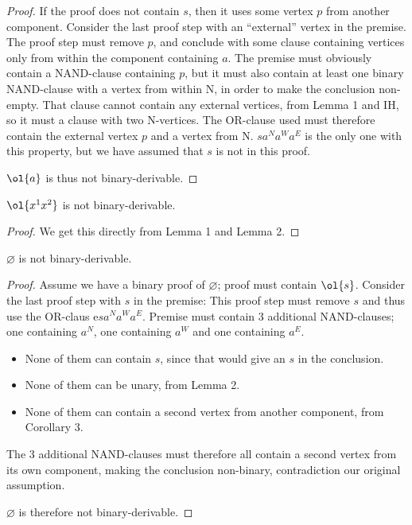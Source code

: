 \begin{proof}
  If the proof does not contain $s$, then it uses some vertex $p$ from another component.
  Consider the last proof step with an ``external'' vertex in the premise.
  The proof step must remove $p$, and conclude with some clause containing vertices only from within the component containing $a$.
  The premise must obviously contain a NAND-clause containing $p$, but it must also contain at least one binary NAND-clause with a vertex from within N, in order to make the conclusion non-empty.
  That clause cannot contain any external vertices, from Lemma 1 and IH, so it must a clause with two N-vertices.
  The OR-clause used must therefore contain the external vertex $p$ and a vertex from N.
  $sa^Na^Wa^E$ is the only one with this property, but we have assumed that $s$ is not in this proof.

  $\ol{a}$ is thus not binary-derivable.
\end{proof}
\begin{corollary}
  $\ol{x^1x^2}$ is not binary-derivable.
  \label{thm:non_binary_derivable_uv}
\end{corollary}
\begin{proof}
  We get this directly from Lemma 1 and Lemma 2.
\end{proof}

\begin{theorem}
  $\varnothing$ is not binary-derivable.
  \label{thm:non_binary_derivable_paradox}
\end{theorem}
\begin{proof}
  Assume we have a binary proof of $\varnothing$;
  proof must contain $\ol{s}$.
  Consider the last proof step with $s$ in the premise:
  This proof step must remove $s$ and thus use the OR-claus e$sa^Na^Wa^E$.
  Premise must contain 3 additional NAND-clauses;
  one containing $a^N$, one containing $a^W$ and one containing $a^E$.
  \begin{itemize}
    \item None of them can contain $s$, since that would give an $s$ in the conclusion.
    \item None of them can be unary, from Lemma 2.
    \item None of them can contain a second vertex from another component, from Corollary 3.
  \end{itemize}
  The 3 additional NAND-clauses must therefore all contain a second vertex from its own component,
  making the conclusion non-binary, contradiction our original assumption.

  $\varnothing$ is therefore not binary-derivable.
\end{proof}

